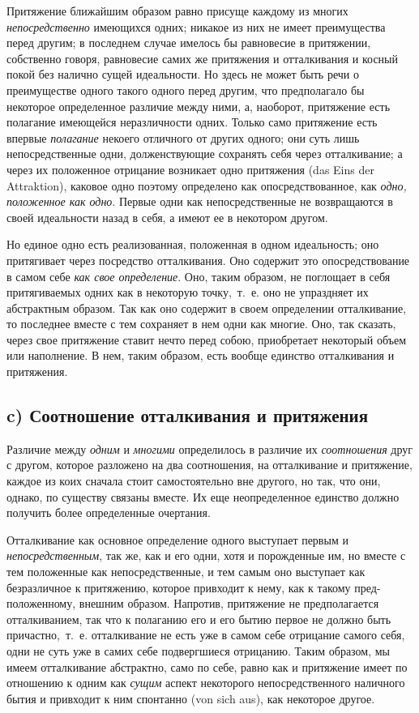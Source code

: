 Притяжение ближайшим образом равно присуще каждому из многих
{\em непосредственно} имеющихся одних; никакое из них
не имеет преимущества перед другим; в последнем случае имелось бы
равновесие в притяжении, собственно говоря, равновесие самих же притяжения
и отталкивания и косный покой без налично сущей идеальности. Но здесь не
может быть речи о преимуществе одного такого одного перед другим, что
предполагало бы некоторое определенное различие между ними, а, наоборот,
притяжение есть полагание имеющейся неразличности одних. Только само
притяжение есть впервые {\em полагание} некоего
отличного от других одного; они суть лишь непосредственные одни,
долженствующие сохранять себя через отталкивание; а через их положенное
отрицание возникает одно притяжения (das Eins der Attraktion), каковое одно
поэтому определено как опосредствованное, как
{\em одно, положенное как одно}. Первые одни как
непосредственные не возвращаются в своей идеальности назад в себя, а имеют
ее в некотором другом.

Но единое одно есть реализованная, положенная в одном идеальность; оно
притягивает через посредство отталкивания. Оно содержит это
опосредствование в самом себе {\em как свое
определение}. Оно, таким образом, не поглощает в себя притягиваемых одних
как в некоторую точку,~т.~е. оно не упраздняет их абстрактным образом. Так
как оно содержит в своем определении отталкивание, то последнее вместе с
тем сохраняет в нем одни как многие. Оно, так сказать, через свое
притяжение ставит нечто перед собою, приобретает некоторый объем или
наполнение. В нем, таким образом, есть вообще единство отталкивания и
притяжения.

\subsection*{c) Соотношение отталкивания и притяжения}
Различие между {\em одним} и
{\em многими} определилось в различие их
{\em соотношения} друг с другом, которое разложено на
два соотношения, на отталкивание и притяжение, каждое из коих сначала стоит
самостоятельно вне другого, но так, что они, однако, по существу связаны
вместе. Их еще неопределенное единство должно получить более определенные
очертания.

Отталкивание как основное определение одного выступает первым и
{\em непосредственным}, так же, как и его одни, хотя и
порожденные им, но вместе с тем положенные как непосредственные, и тем
самым оно выступает как безразличное к притяжению, которое привходит к
нему, как к такому пред-положенному, внешним образом. Напротив, притяжение
не предполагается отталкиванием, так что к полаганию его и его бытию первое
не должно быть причастно,~т.~е. отталкивание не есть уже в самом себе
отрицание самого себя, одни не суть уже в самих себе подвергшиеся
отрицанию. Таким образом, мы имеем отталкивание абстрактно, само по себе,
равно как и притяжение имеет по отношению к одним как
{\em сущим} аспект некоторого непосредственного
наличного бытия и привходит к ним спонтанно (von sich aus), как некоторое
другое.

